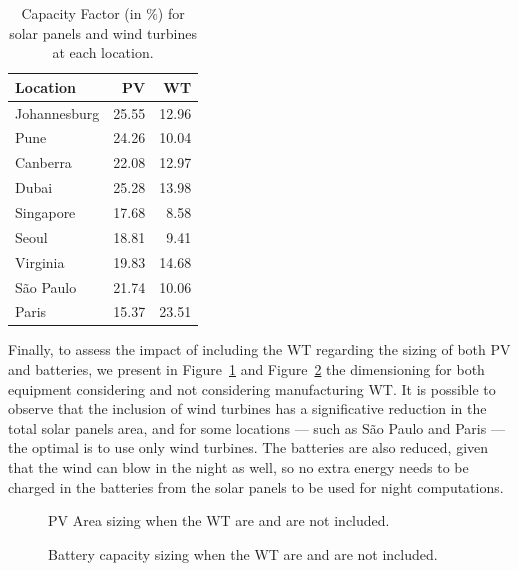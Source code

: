 \begin{table}[H]
  
  \caption{Capacity Factor (in \%) for solar panels and wind turbines at each location.}\label{tab:capacity_factor} \centering
  
  \begin{tabular}{|l|r|r|}
  \hline    
  \textbf{Location} &   \textbf{PV} & \textbf{WT}  \\
  \hline
  Johannesburg & 25.55 & 12.96  \\
  \hline
  Pune        &  24.26   & 10.04    \\
  \hline
  Canberra    & 22.08    & 12.97  \\
  \hline
  Dubai      & 25.28      & 13.98   \\
  \hline
  Singapore & 17.68    & 8.58   \\
  \hline     
  Seoul      & 18.81   &  9.41   \\
  \hline
  Virginia   & 19.83   &  14.68 \\
  \hline
  São Paulo  & 21.74   &  10.06    \\
  \hline 
  Paris      & 15.37   &  23.51   \\
  \hline  

\end{tabular}
\end{table}


Finally, to assess the impact of including the WT regarding the sizing of both PV and batteries, we present in Figure~\ref{fig:wind_pv} and Figure~\ref{fig:wind_bat}  the dimensioning for both equipment considering and not considering manufacturing WT. It is possible to observe that the inclusion of wind turbines has a significative reduction in the total solar panels area, and for some locations --- such as São Paulo and Paris --- the optimal is to use only wind turbines. The batteries are also reduced, given that the wind can blow in the night as well, so no extra energy needs to be charged in the batteries from the solar panels to be used for night computations.

\begin{figure}[H]
  \centering
  {}
  \caption{PV Area sizing when the WT are and are not included. }
  \label{fig:wind_pv}
\end{figure}


\begin{figure}[H]
  \centering
  {}
  \caption{Battery capacity sizing when the WT are and are not included. }
  \label{fig:wind_bat}

\end{figure}


